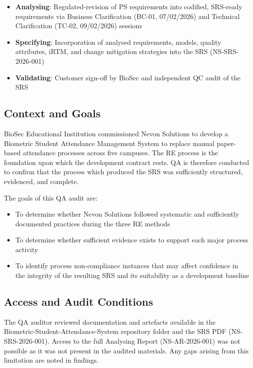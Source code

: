 \documentclass[11pt,a4paper]{article}
\begin{document}
\begin{itemize}[leftmargin=*]
\item \textbf{Analysing}: Regulated-revision of PS requirements into codified, SRS-ready requirements via Business Clarification (BC-01, 07/02/2026) and Technical Clarification (TC-02, 09/02/2026) sessions
\item \textbf{Specifying}: Incorporation of analysed requirements, models, quality attributes, iRTM, and change mitigation strategies into the SRS (NS-SRS-2026-001)
\item \textbf{Validating}: Customer sign-off by BioSec and independent QC audit of the SRS
\end{itemize}

\subsection{Context and Goals}

BioSec Educational Institution commissioned Nevon Solutions to develop a Biometric Student Attendance Management System to replace manual paper-based attendance processes across five campuses. The RE process is the foundation upon which the development contract rests. QA is therefore conducted to confirm that the process which produced the SRS was sufficiently structured, evidenced, and complete.

The goals of this QA audit are:

\begin{itemize}[leftmargin=*]
\item To determine whether Nevon Solutions followed systematic and sufficiently documented practices during the three RE methods
\item To determine whether sufficient evidence exists to support each major process activity
\item To identify process non-compliance instances that may affect confidence in the integrity of the resulting SRS and its suitability as a development baseline
\end{itemize}

\subsection{Access and Audit Conditions}

The QA auditor reviewed documentation and artefacts available in the Biometric-Student-Attendance-System repository folder and the SRS PDF (NS-SRS-2026-001). Access to the full Analysing Report (NS-AR-2026-001) was not possible as it was not present in the audited materials. Any gaps arising from this limitation are noted in findings.
\end{document}
